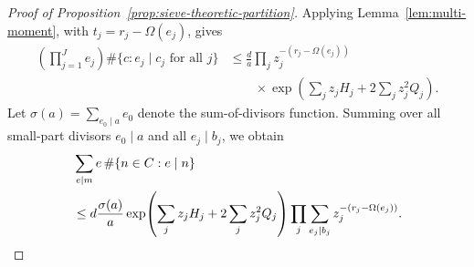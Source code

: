 \documentclass[10pt,a4paper]{amsart}
\begin{document}
\begin{proof}[Proof of Proposition~\ref{prop:sieve-theoretic-partition}]
Applying Lemma~\ref{lem:multi-moment}, with
$t_j=r_j-\Omega(e_j)$, gives
\begin{align*}
 \left(\prod_{j=1}^{J}e_j\right)
 \#\{c:e_j\mid c_j\text{ for all }j\}
 &\le \frac da\prod_jz_j^{-(r_j-\Omega(e_j))}\\
 &\qquad{}\times
 \exp\!\left(\sum_jz_jH_j+2\sum_jz_j^2Q_j\right).
\end{align*}
Let $\sigma(a)=\sum_{e_0\mid a} e_0$ denote the sum-of-divisors function. Summing over all
small-part divisors $e_0\mid a$ and all $e_j\mid b_j$, we obtain
\begin{align}
&\sum_{e\mid m}e\,\#\{n\in C:e\mid n\}\notag\\
&\le d\frac{\sigma(a)}a
 \exp\!\left(\sum_jz_jH_j+2\sum_jz_j^2Q_j\right)
 \prod_j
 \sum_{e_j\mid b_j}z_j^{-(r_j-\Omega(e_j))}.
\label{eq:class-master-raw}
\end{align}


\end{proof}
\end{document}
